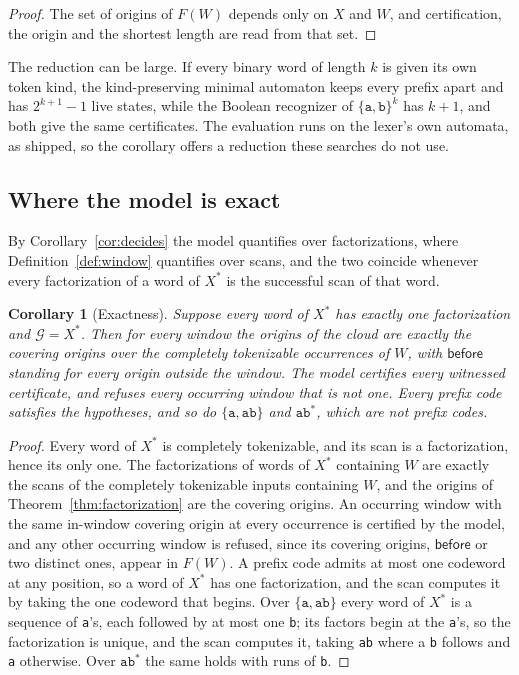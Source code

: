 \documentclass[11pt,a4paper]{article}
\theoremstyle{definition}
\theoremstyle{plain}
\newtheorem{corollary}{Corollary}
\newcommand{\code}[1]{\texttt{#1}}
\newcommand{\before}{\mathsf{before}}
\begin{document}
\begin{proof}
The set of origins of $F(W)$ depends only on $X$ and $W$, and certification, the origin and the shortest length are read
from that set.
\end{proof}

The reduction can be large. If every binary word of length $k$ is given its own token kind, the kind-preserving minimal
automaton keeps every prefix apart and has $2^{k+1} - 1$ live states, while the Boolean recognizer of
$\{\code{a}, \code{b}\}^k$ has $k + 1$, and both give the same certificates. The evaluation runs on the lexer's own
automata, as shipped, so the corollary offers a reduction these searches do not use.

\subsection{Where the model is exact}
\label{sec:exact}

By Corollary~\ref{cor:decides} the model quantifies over factorizations, where Definition~\ref{def:window} quantifies
over scans, and the two coincide whenever every factorization of a word of $X^*$ is the successful scan of that word.

\begin{corollary}[Exactness]
\label{cor:exact}
Suppose every word of $X^*$ has exactly one factorization and $\mathcal{G} = X^*$. Then for every window the origins of
the cloud are exactly the covering origins over the completely tokenizable occurrences of $W$, with $\before$ standing
for every origin outside the window. The model certifies every witnessed certificate, and refuses every occurring window
that is not one. Every prefix code satisfies the hypotheses, and so do $\{\code{a}, \code{ab}\}$ and $\code{ab}^*$,
which are not prefix codes.
\end{corollary}

\begin{proof}
Every word of $X^*$ is completely tokenizable, and its scan is a factorization, hence its only one. The factorizations
of words of $X^*$ containing $W$ are exactly the scans of the completely tokenizable inputs containing $W$, and the
origins of Theorem~\ref{thm:factorization} are the covering origins. An occurring window with the same in-window
covering origin at every occurrence is certified by the model, and any other occurring window is refused, since its
covering origins, $\before$ or two distinct ones, appear in $F(W)$. A prefix code admits at most one codeword at any
position, so a word of $X^*$ has one factorization, and the scan computes it by taking the one codeword that begins.
Over $\{\code{a}, \code{ab}\}$ every word of $X^*$ is a sequence of \code{a}'s, each followed by at most one \code{b};
its factors begin at the \code{a}'s, so the factorization is unique, and the scan computes it, taking \code{ab} where a
\code{b} follows and \code{a} otherwise. Over $\code{ab}^*$ the same holds with runs of \code{b}.
\end{proof}
\end{document}
